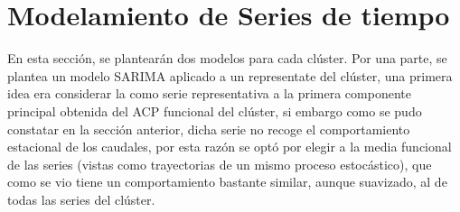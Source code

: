 \documentclass[12pt,oneside]{book}\usepackage[]{graphicx}\usepackage[]{color}
\theoremstyle{definition} %
\begin{document}
% 
% 
% 
% 
% 




\section{Modelamiento de Series de tiempo}

En esta sección, se plantearán dos modelos para cada clúster. Por una parte, se plantea un modelo SARIMA aplicado a un representate del clúster, una primera idea era considerar la como serie representativa a la primera componente principal obtenida del ACP funcional del clúster, si embargo como se pudo constatar en la sección anterior, dicha serie no recoge el comportamiento estacional de los caudales, por esta razón se optó por elegir a la media funcional de las series (vistas como trayectorias de un mismo proceso estocástico), que como se vio tiene un comportamiento bastante similar, aunque suavizado, al de todas las series del clúster.
\end{document}
